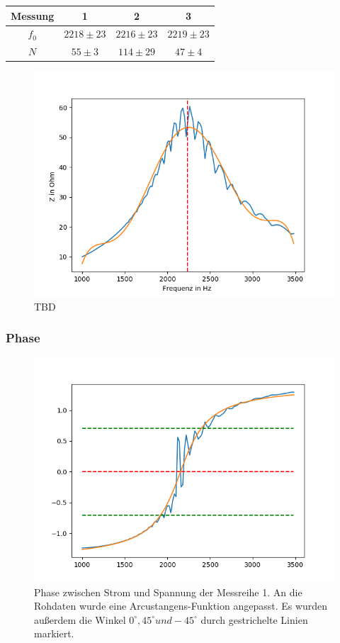 \documentclass[12pt,a4paper]{article}
\begin{document}
\begin{table}
\centering
\begin{tabular}{|c|c|c|c|}
\hline
Messung & 1 & 2 & 3\\
\hline
$f_0$ & $2218\pm 23$ & $2216\pm 23$ & $2219\pm 23$\\
\hline
$N$ & $55\pm 3$ & $114\pm 29$ & $47\pm 4$\\
\hline
\end{tabular}
\label{tab:Parallel_Impedanz}
\end{table}

\begin{figure}
\centering
\includegraphics[scale=1]{Bilder/Parallel_Impedanz.png}
\caption{TBD}
\label{fig:parallel_Impedanz}
\end{figure}

\subsubsection{Phase}
\begin{figure}
\includegraphics[scale=1]{Bilder/Parallel_Phase.png}
\caption{Phase zwischen Strom und Spannung der Messreihe 1. An die Rohdaten wurde eine Arcustangens-Funktion angepasst. Es wurden außerdem die Winkel $0^\circ, 45^\circ und -45^\circ$ durch gestrichelte Linien markiert.}
\label{fig:parallel_Phase}
\end{figure}
\end{document}
